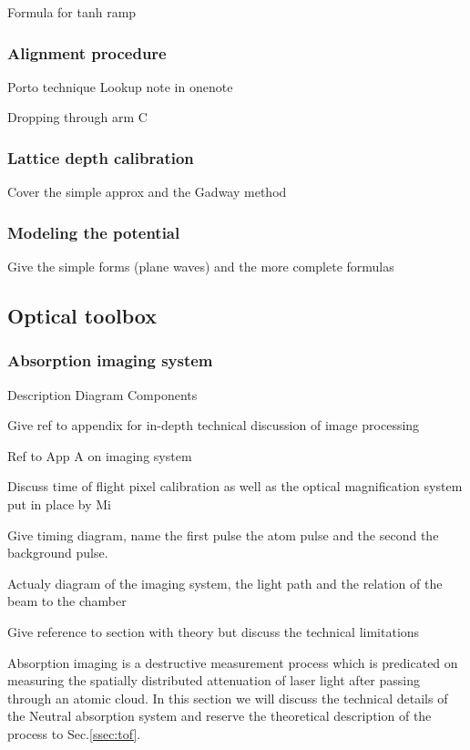 Formula for tanh ramp

\subsubsection{Alignment procedure} \label{sssec:532_align}

Porto technique
Lookup note in onenote

Dropping through arm C

\subsubsection{Lattice depth calibration} \label{sssec:532_lattice_depth}

Cover the simple approx and the Gadway method

\subsubsection{Modeling the potential} \label{sssec:532_modeling}

Give the simple forms (plane waves) and the more complete formulas

\subsection{Optical toolbox} \label{ssec:op_tools}

\subsubsection{Absorption imaging system}

Description
Diagram
Components

Give ref to appendix for in-depth technical discussion of image processing

Ref to App A on imaging system

Discuss time of flight pixel calibration as well as the optical magnification system put in place by Mi

Give timing diagram, name the first pulse the atom pulse and the second the background pulse.

Actualy diagram of the imaging system, the light path and the relation of the beam to the chamber

Give reference to section with theory but discuss the technical limitations
 
Absorption imaging is a destructive measurement process which is predicated on measuring the spatially distributed attenuation of laser light after passing through an atomic cloud. In this section we will discuss the technical details of the Neutral absorption system and reserve the theoretical description of the process to Sec.\ref{ssec:tof}. 

